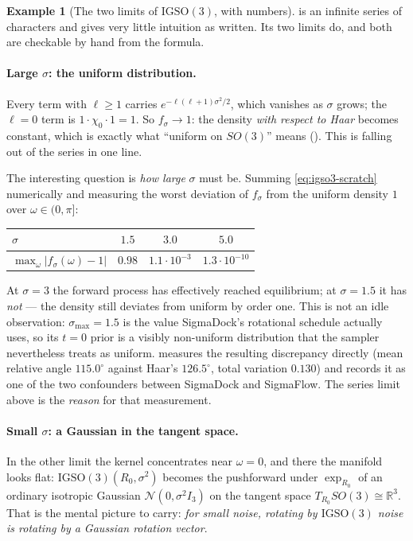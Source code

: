 \documentclass[11pt,a4paper]{report}
\theoremstyle{definition}
\newtheorem{example}[example]{Example}
\theoremstyle{remark}
\newcommand{\RR}{\mathbb R}
\begin{document}
\begin{example}[The two limits of $\mathrm{IGSO}(3)$, with numbers]
\label{ex:igso3-limits}
 is an infinite series of characters and gives very
little intuition as written. Its two limits do, and both are checkable by
hand from the formula.

\paragraph{Large $\sigma$: the uniform distribution.} Every term with
$\ell\ge1$ carries $e^{-\ell(\ell+1)\sigma^2/2}$, which vanishes as
$\sigma$ grows; the $\ell=0$ term is $1\cdot\chi_0\cdot1=1$. So
$f_\sigma\to1$: the density \emph{with respect to Haar} becomes constant,
which is exactly what ``uniform on $SO(3)$'' means
(). This is
 falling out of the series in one line.

The interesting question is \emph{how large} $\sigma$ must be. Summing
\eqref{eq:igso3-scratch} numerically and measuring the worst deviation of
$f_\sigma$ from the uniform density $1$ over $\omega\in(0,\pi]$:

\begin{center}
\begin{tabular}{lccc}
\toprule
$\sigma$ & $1.5$ & $3.0$ & $5.0$ \\
\midrule
$\max_\omega|f_\sigma(\omega)-1|$ & $0.98$ & $1.1\cdot10^{-3}$ & $1.3\cdot10^{-10}$ \\
\bottomrule
\end{tabular}
\end{center}

At $\sigma=3$ the forward process has effectively reached equilibrium; at
$\sigma=1.5$ it has \emph{not} --- the density still deviates from uniform
by order one. This is not an idle observation: $\sigma_{\max}=1.5$ is the
value SigmaDock's rotational schedule actually uses, so its
$t{=}0$ prior is a visibly non-uniform distribution that the sampler
nevertheless treats as uniform.  measures the
resulting discrepancy directly (mean relative angle $115.0^\circ$ against
Haar's $126.5^\circ$, total variation $0.130$) and records it as one of the
two confounders between SigmaDock and SigmaFlow. The series limit above is
the \emph{reason} for that measurement.

\paragraph{Small $\sigma$: a Gaussian in the tangent space.} In the other
limit the kernel concentrates near $\omega=0$, and there the manifold looks
flat: $\mathrm{IGSO}(3)(R_0,\sigma^2)$ becomes the pushforward under
$\exp_{R_0}$ of an ordinary isotropic Gaussian $\mathcal N(0,\sigma^2I_3)$
on the tangent space $T_{R_0}SO(3)\cong\RR^3$. That is the mental picture to
carry: \emph{for small noise, rotating by $\mathrm{IGSO}(3)$ noise is
rotating by a Gaussian rotation vector}.


\end{example}
\end{document}
